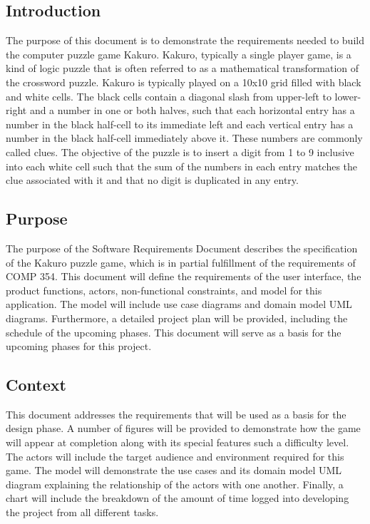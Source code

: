 \documentclass[12pt]{article}
\begin{document}
\subsection{Introduction}

\hspace{\parindent} The purpose of this document is to demonstrate the requirements needed to build the computer puzzle game Kakuro. Kakuro, typically a single player game, is a kind of logic puzzle that is often referred to as a mathematical transformation of the crossword puzzle. Kakuro is typically played on a 10x10 grid filled with black and white cells. The black cells contain a diagonal slash from upper-left to lower-right and a number in one or both halves, such that each horizontal entry has a number in the black half-cell to its immediate left and each vertical entry has a number in the black half-cell immediately above it. These numbers are commonly called clues. The objective of the puzzle is to insert a digit from 1 to 9 inclusive into each white cell such that the sum of the numbers in each entry matches the clue associated with it and that no digit is duplicated in any entry. 

\subsection{Purpose}

\hspace{\parindent} The purpose of the Software Requirements Document describes the specification of the Kakuro puzzle game, which is in partial fulfillment of the requirements of COMP 354. This document will define the requirements of the user interface, the product functions, actors, non-functional constraints, and model for this application. The model will include use case diagrams and domain model UML diagrams. Furthermore, a detailed project plan will be provided, including the schedule of the upcoming phases. This document will serve as a basis for the upcoming phases for this project. 

\subsection{Context}

\hspace{\parindent} This document addresses the requirements that will be used as a basis for the design phase. A number of figures will be provided to demonstrate how the game will appear at completion along with its special features such a difficulty level. The actors will include the target audience and environment required for this game. The model will demonstrate the use cases and its domain model UML diagram explaining the relationship of the actors with one another. Finally, a chart will include the breakdown of the amount of time logged into developing the project from all different tasks. 
\end{document}

